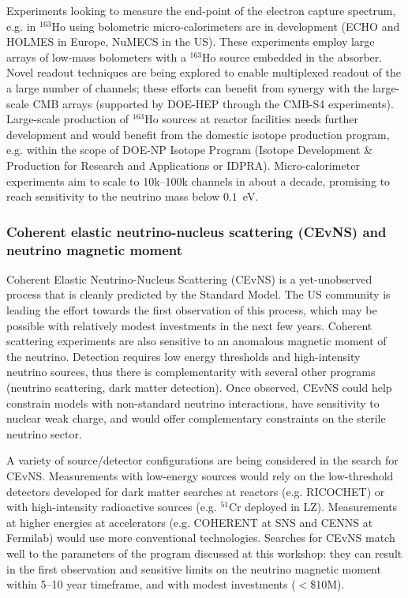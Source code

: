 Experiments looking to measure the end-point of the electron capture
spectrum, e.g. in $^{163}$Ho using bolometric micro-calorimeters are
in development (ECHO and HOLMES in Europe, NuMECS in the US). These
experiments employ large arrays of low-mass bolometers with a
$^{163}$Ho source embedded in the absorber. Novel readout techniques
are being explored to enable multiplexed readout of the a large number
of channels; these efforts can benefit from synergy with the
large-scale CMB arrays (supported by DOE-HEP through the CMB-S4
experiments). Large-scale production of $^{163}$Ho sources at reactor
facilities needs further development and would benefit from the
domestic isotope production program, e.g. within the scope of DOE-NP
Isotope Program (Isotope Development \& Production for Research and
Applications or IDPRA).  Micro-calorimeter experiments aim to scale to
10k--100k channels in about a decade, promising to reach sensitivity
to the neutrino mass below $0.1$~eV.

\subsubsection{Coherent elastic neutrino-nucleus scattering (CEvNS)
  and neutrino magnetic moment}

Coherent Elastic Neutrino-Nucleus Scattering (CEvNS) is a yet-unobserved
process that is cleanly predicted by the Standard Model.  The US
community is leading the effort towards the first observation of this
process, which may be possible with relatively modest investments in
the next few years. Coherent scattering experiments are also
sensitive to an anomalous magnetic moment of the neutrino. Detection
requires low energy thresholds and high-intensity neutrino sources,
thus there is complementarity with several other programs (neutrino
scattering, dark matter detection). Once observed, CEvNS could help
constrain models with non-standard neutrino interactions, have
sensitivity to nuclear weak charge, and would offer complementary
constraints on the sterile neutrino sector. 

A variety of source/detector configurations are being considered in the
search for CEvNS. Measurements with low-energy sources would rely
on the low-threshold detectors developed for dark matter searches at
reactors (e.g. RICOCHET) or with high-intensity radioactive
sources (e.g. $^{51}$Cr deployed in LZ). Measurements at higher
energies at accelerators (e.g. COHERENT at SNS and CENNS at Fermilab)
would use more conventional technologies. Searches for CEvNS match
well to the parameters of the program discussed at this workshop: they
can result in the first observation and sensitive limits on the
neutrino magnetic moment within 5--10 year timeframe, and with modest
investments ($<$\$10M). 

